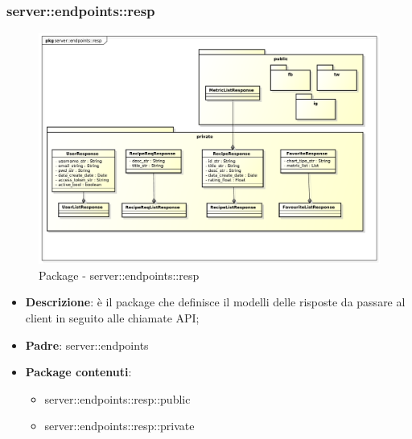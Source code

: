 \subsubsection{server::endpoints::resp} %
\label{ssub:bdsm_app_server_endpoints_resp}
\begin{figure}[!htbp]
	\centering
	\centerline{\includegraphics[scale=0.45]{./images/server/resp.pdf}}
	\caption{Package - server::endpoints::resp}
\end{figure}

\begin{itemize}
  \item \textbf{Descrizione}: è il package che definisce il modelli delle risposte da passare al client in seguito alle chiamate API;
  \item \textbf{Padre}: server::endpoints
  \item \textbf{Package contenuti}:
  	\begin{itemize}
  		\item server::endpoints::resp::public
  		\item server::endpoints::resp::private
	\end{itemize}
\end{itemize}

